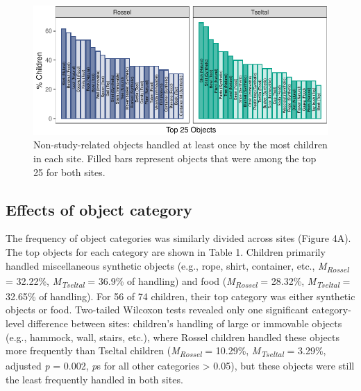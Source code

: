 \documentclass[10pt, letterpaper]{article}
\newenvironment{CodeChunk}{}{}
\begin{document}
\begin{CodeChunk}
\begin{figure}[!ht]

{\centering \includegraphics{figs/top-objects-fig-1} 

}

\caption[Non-study-related objects handled at least once by the most children in each site]{Non-study-related objects handled at least once by the most children in each site. Filled bars represent objects that were among the top 25 for both sites.}\label{fig:top-objects-fig}
\end{figure}
\end{CodeChunk}

\hypertarget{effects-of-object-category}{%
\subsection{Effects of object
category}\label{effects-of-object-category}}

The frequency of object categories was similarly divided across sites
(Figure 4A). The top objects for each category are shown in Table 1.
Children primarily handled miscellaneous synthetic objects (e.g., rope,
shirt, container, etc., \emph{M}\textsubscript{\emph{Rossel}} = 32.22\%,
\emph{M}\textsubscript{\emph{Tseltal}} = 36.9\% of handling) and food
(\emph{M}\textsubscript{\emph{Rossel}} = 28.32\%,
\emph{M}\textsubscript{\emph{Tseltal}} = 32.65\% of handling). For 56 of
74 children, their top category was either synthetic objects or food.
Two-tailed Wilcoxon tests revealed only one significant category-level
difference between sites: children's handling of large or immovable
objects (e.g., hammock, wall, stairs, etc.), where Rossel children
handled these objects more frequently than Tseltal children
(\emph{M}\textsubscript{\emph{Rossel}} = 10.29\%,
\emph{M}\textsubscript{\emph{Tseltal}} = 3.29\%, adjusted \emph{p} =
0.002, \emph{p}s for all other categories \textgreater{} 0.05), but
these objects were still the least frequently handled in both sites.
\end{document}

